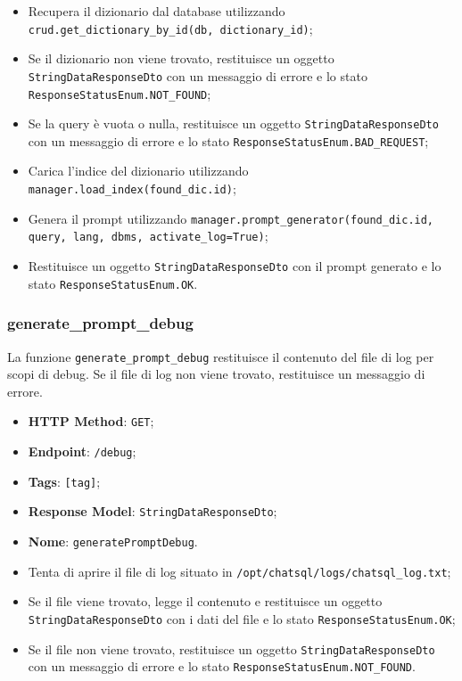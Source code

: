 \begin{itemize}
\item Recupera il dizionario dal database utilizzando \texttt{crud.get\_dictionary\_by\_id(db, dictionary\_id)};
\item Se il dizionario non viene trovato, restituisce un oggetto \texttt{StringDataResponseDto} con un messaggio di errore e lo stato \texttt{ResponseStatusEnum.NOT\_FOUND};
\item Se la query è vuota o nulla, restituisce un oggetto \texttt{StringDataResponseDto} con un messaggio di errore e lo stato \texttt{ResponseStatusEnum.BAD\_REQUEST};
\item Carica l'indice del dizionario utilizzando \texttt{manager.load\_index(found\_dic.id)};
\item Genera il prompt utilizzando \texttt{manager.prompt\_generator(found\_dic.id, query, lang, dbms, activate\_log=True)};
\item Restituisce un oggetto \texttt{StringDataResponseDto} con il prompt generato e lo stato \texttt{ResponseStatusEnum.OK}.
\end{itemize}

\subsubsection{generate\_prompt\_debug}

\par La funzione \texttt{generate\_prompt\_debug} restituisce il contenuto del file di log per scopi di debug. Se il file di log non viene trovato, restituisce un messaggio di errore.

\begin{itemize}
\item \textbf{HTTP Method}: \texttt{GET};
\item \textbf{Endpoint}: \texttt{/debug};
\item \textbf{Tags}: \texttt{[tag]};
\item \textbf{Response Model}: \texttt{StringDataResponseDto};
\item \textbf{Nome}: \texttt{generatePromptDebug}.
\end{itemize}

\begin{itemize}
\item Tenta di aprire il file di log situato in \texttt{/opt/chatsql/logs/chatsql\_log.txt};
\item Se il file viene trovato, legge il contenuto e restituisce un oggetto \texttt{StringDataResponseDto} con i dati del file e lo stato \texttt{ResponseStatusEnum.OK};
\item Se il file non viene trovato, restituisce un oggetto \texttt{StringDataResponseDto} con un messaggio di errore e lo stato \texttt{ResponseStatusEnum.NOT\_FOUND}.
\end{itemize}

